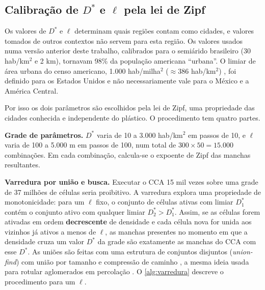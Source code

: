 \subsection{Calibração de $D^{*}$ e $\ell$ pela lei de Zipf}
\label{sec:calibracao}

Os valores de $D^{*}$ e $\ell$ determinam quais regiões contam como cidades, e valores tomados de outros contextos não servem para esta região. Os valores usados numa versão anterior deste trabalho, calibrados para o semiárido brasileiro (30 hab/km$^2$ e 2 km), tornavam 98\% da população americana ``urbana''. O limiar de área urbana do censo americano, 1.000 hab/milha$^2$ ($\approx 386$ hab/km$^2$) \cite{census2020}, foi definido para os Estados Unidos e não necessariamente vale para o México e a América Central.

Por isso os dois parâmetros são escolhidos pela lei de Zipf, uma propriedade das cidades conhecida e independente do plástico. O procedimento tem quatro partes.

\textbf{Grade de parâmetros.} $D^{*}$ varia de 10 a 3.000 hab/km$^2$ em passos de 10, e $\ell$ varia de 100 a 5.000 m em passos de 100, num total de $300 \times 50 = 15.000$ combinações. Em cada combinação, calcula-se o expoente de Zipf das manchas resultantes.

\textbf{Varredura por união e busca.} Executar o CCA 15 mil vezes sobre uma grade de 37 milhões de células seria proibitivo. A varredura explora uma propriedade de monotonicidade: para um $\ell$ fixo, o conjunto de células ativas com limiar $D^{*}_1$ contém o conjunto ativo com qualquer limiar $D^{*}_2 > D^{*}_1$. Assim, se as células forem ativadas em ordem \textbf{decrescente} de densidade e cada célula nova for unida aos vizinhos já ativos a menos de $\ell$, as manchas presentes no momento em que a densidade cruza um valor $D^{*}$ da grade são exatamente as manchas do CCA com esse $D^{*}$. As uniões são feitas com uma estrutura de conjuntos disjuntos (\textit{union-find}) com união por tamanho e compressão de caminho \cite{tarjan1975}, a mesma ideia usada para rotular aglomerados em percolação \cite{hoshen1976,newmanziff2000}. O \autoref{alg:varredura} descreve o procedimento para um $\ell$.

